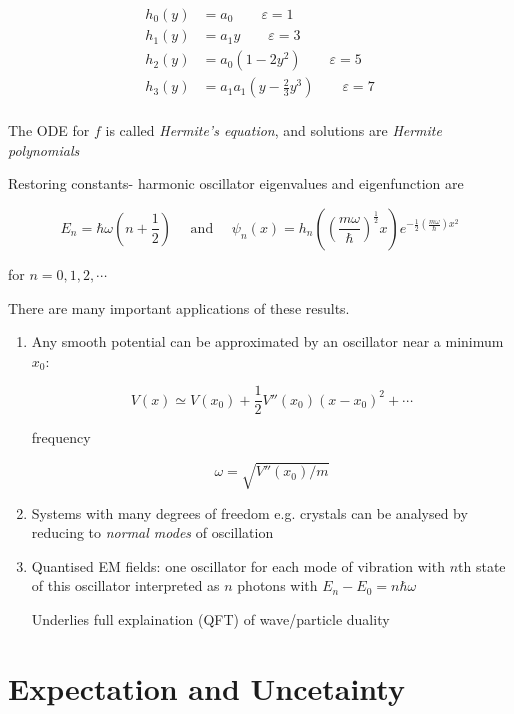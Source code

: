 \documentclass[a4paper]{article}
\begin{document}
\begin{align*}
h_{0}(y) & = a_{0}  \qquad \varepsilon = 1\\
h_{1}(y) & = a_{1} y \qquad \varepsilon = 3\\
h_{2}(y) & = a_{0} (1 - 2y^{2}) \qquad \varepsilon = 5\\
h_{3}(y) & = a_{1} a_{1} (y - \frac{2}{3} y^{3}) \qquad \varepsilon = 7\\
\end{align*}

The ODE for $ f $ is called \emph{Hermite's equation}, and solutions are \emph{Hermite polynomials}

Restoring constants- harmonic oscillator eigenvalues and eigenfunction are

\[ E_{n} = \hbar \omega  (n + \frac{1}{2}) \quad \text{ and } \quad \psi_{n}(x) = h_{n} \left(  \left(\frac{m \omega}{\hbar}   \right)^{\frac{1}{2}}  x \right)  e^{-\frac{1}{2} \left( \frac{m \omega}{\hbar} \right) x^{2} }     \]

for $ n = 0,1,2,\cdots $

There are many important applications of these results.

\begin{enumerate}
	\item Any smooth potential can be approximated by an oscillator near a minimum $ x_{0} $:
	
	\[ V(x) \simeq V(x_{0}) + \frac{1}{2} V''(x_{0}) (x - x_{0})^{2} + \cdots \]
	
	frequency
	
	\[ \omega = \sqrt{V''(x_{0}) / m} \]
	
	\item Systems with many degrees of freedom e.g. crystals can be analysed by reducing to \emph{normal modes} of oscillation
	
	\item Quantised EM fields: one oscillator for each mode of vibration with $ n $th state of this oscillator interpreted as $ n $ photons with $ E_{n} - E_{0} = n \hbar \omega $
	
	Underlies full explaination (QFT) of wave/particle duality
	
\end{enumerate}


\section{Expectation and Uncetainty}
\end{document}
